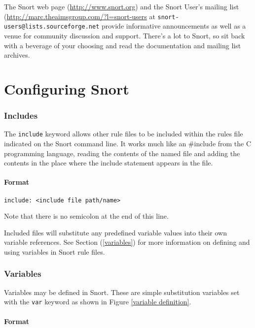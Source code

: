 \documentclass[english]{report}
\newenvironment{note}{
\samepage
    \vspace{10pt}{\textsf{
        {\hspace{7pt}\Huge{$\triangle$\hspace{-12.5pt}{\Large{$^!$}}}}\hspace{5pt}
        {\Large{NOTE}}
    }
    }
   \begin{center}
    \par\vspace{-17pt}

    \begin{lrbox}{\savepar}
    \begin{minipage}[r]{6in}
}
{
    \end{minipage}
    \end{lrbox}
    \fbox{
        \usebox{
            \savepar
        }
    }
    \par\vskip10pt
    \end{center}
}
\begin{document}
The Snort web page (\url{http://www.snort.org}) and the Snort User's mailing
list (\url{http://marc.theaimsgroup.com/?l=snort-users} at
\verb?snort-users@lists.sourceforge.net? provide informative announcements as
well as a venue for community discussion and support. There's a lot to Snort, so
sit back with a beverage of your choosing and read the documentation and
mailing list archives.

\newpage
\chapter{Configuring Snort \label{Configuring Snort}}

\subsection{Includes}

The {\tt include} keyword allows other rule files to be included within the rules
file indicated on the Snort command line. It works much like an \#include from
the C programming language, reading the contents of the named file and adding the contents
in the place where the include statement appears in the file.

\subsubsection{Format}
\begin{verbatim}
include: <include file path/name>
\end{verbatim}

\begin{note}
Note that there is no semicolon at the end of this line. 
\end{note}

Included files will
substitute any predefined variable values into their own variable references.
See Section (\ref{variables}) for more information on defining and
using variables in Snort rule files.

\subsection{Variables \label{variables}}

Variables may be defined in Snort. These are simple substitution variables
set with the {\tt var} keyword as shown in Figure \ref{variable definition}.

\subsubsection{Format}
\end{document}
